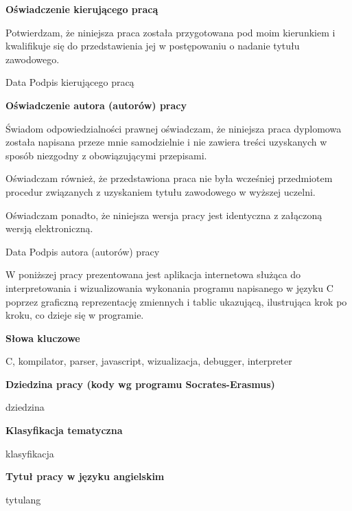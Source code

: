 \documentclass[a4paper,twoside,openright,11pt]{report}
\begin{document}
  \begin{titlepage}
    \large
    \null
    \vfill
    
   \textbf{\Large Oświadczenie kierującego pracą }
      \vspace{10mm}
      
   Potwierdzam, że niniejsza praca została przygotowana pod moim 
   kierunkiem i kwalifikuje się do przedstawienia jej w postępowaniu 
   o nadanie tytułu zawodowego. 
   \vspace{15mm}
   
   Data \hfill Podpis kierującego pracą 
   
   \vspace{3cm}
   \textbf{\Large Oświadczenie autora (autorów) pracy}
    \vspace{10mm}
    
   Świadom odpowiedzialności prawnej oświadczam, że niniejsza praca dyplomowa została 
   napisana przeze mnie samodzielnie i nie zawiera treści uzyskanych w sposób niezgodny 
   z obowiązującymi przepisami. 
   
   Oświadczam również, że przedstawiona praca nie była 
   wcześniej przedmiotem procedur związanych z uzyskaniem tytułu zawodowego w wyższej uczelni. 
   
   Oświadczam ponadto, że niniejsza wersja pracy jest identyczna z załączoną wersją elektroniczną. 
   \vspace{15mm}
   
   Data \hfill Podpis autora (autorów) pracy
    \vspace{4cm}
  \end{titlepage}

  \begin{titlepage}
  \null\nobreak\vfil
  \begin{center}%
    \bfseries\large \abstractname
  \end{center}
W poniższej pracy prezentowana jest aplikacja internetowa służąca do interpretowania i wizualizowania wykonania programu napisanego w języku C poprzez graficzną reprezentację zmiennych i tablic ukazującą, ilustrująca krok po kroku, co dzieje się w programie.  \vspace*{26pt}%
  \begin{center}%
    \bfseries\large Słowa kluczowe
  \end{center}
  C, kompilator, parser, javascript, wizualizacja, debugger, interpreter
  \vspace*{26pt}%
  \begin{center}%
    \bfseries\large Dziedzina pracy (kody wg programu Socrates-Erasmus)
  \end{center}
   dziedzina
  \vspace*{26pt}%
  \begin{center}%
    \bfseries\large Klasyfikacja tematyczna
  \end{center}
  klasyfikacja
  \vspace*{26pt}%
  \begin{center}%
    \bfseries\large Tytuł pracy w języku angielskim
  \end{center}
  tytulang
  \nobreak\vfil\null\cleardoublepage
  \end{titlepage}
\end{document}
